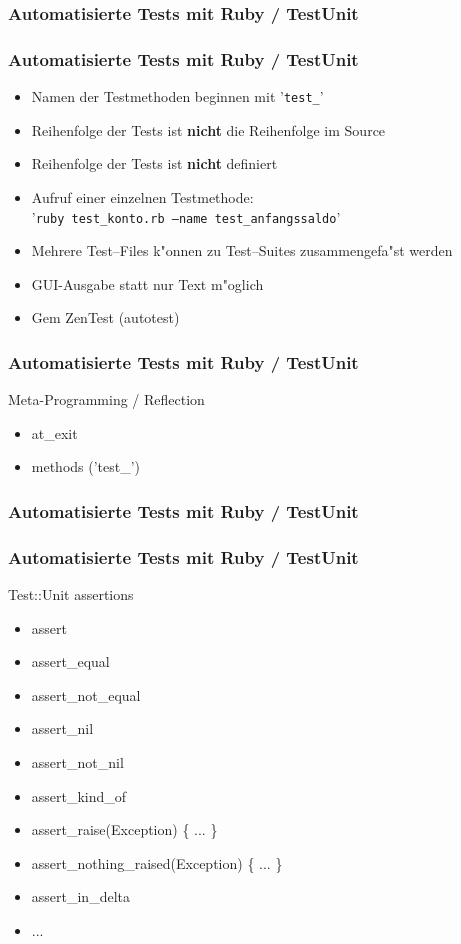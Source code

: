 \documentclass{beamer}
\begin{document}
\begin{frame}[containsverbatim]
  \frametitle{Automatisierte Tests mit Ruby / TestUnit}
%
\end{frame}

\begin{frame}
  \frametitle{Automatisierte Tests mit Ruby / TestUnit}
  \begin{itemize}
    \item Namen der Testmethoden beginnen mit '\texttt{test\_}'
    \item Reihenfolge der Tests ist {\bf nicht} die Reihenfolge im Source
    \item Reihenfolge der Tests ist {\bf nicht} definiert
    \item Aufruf einer einzelnen Testmethode:\\ '\texttt{ruby test\_konto.rb --name test\_anfangssaldo}'
    \item Mehrere Test--Files k"onnen zu Test--Suites zusammengefa"st werden
    \item GUI-Ausgabe statt nur Text m"oglich
    \item Gem ZenTest (autotest)
  \end{itemize}
\end{frame}

\begin{frame}
  \frametitle{Automatisierte Tests mit Ruby / TestUnit}
  Meta-Programming / Reflection
  \begin{itemize}
    \item at\_exit
    \item methods ('test\_')
  \end{itemize}
\end{frame}

\begin{frame}[containsverbatim]
  \frametitle{Automatisierte Tests mit Ruby / TestUnit}
  
\end{frame}

\begin{frame}
  \frametitle{Automatisierte Tests mit Ruby / TestUnit}
  Test::Unit assertions
  \begin{itemize}
    \item assert
    \item assert\_equal
    \item assert\_not\_equal
    \item assert\_nil
    \item assert\_not\_nil
    \item assert\_kind\_of
    \item assert\_raise(Exception) \{ ... \}
    \item assert\_nothing\_raised(Exception) \{ ... \}
    \item assert\_in\_delta
    \item ...
  \end{itemize}
\end{frame}
\end{document}
